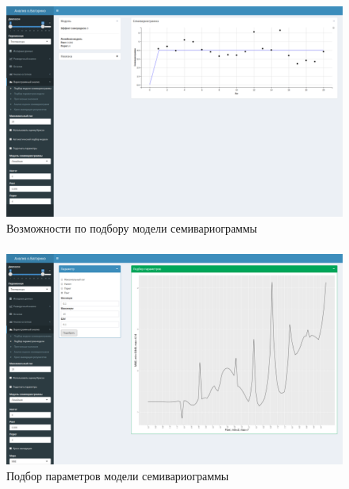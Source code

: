 \documentclass[notheorems]{beamer}
\theoremstyle{definition}
\theoremstyle{example}
\theoremstyle{plain}
\begin{document}
\begin{frame}
  \frametitle{\large\secname}
  \framesubtitle{\subsecname}
    \begin{figure}[h]
    \includegraphics[width=1\textwidth]{../../figures/static/4_variogram.png}
    \caption{Возможности по подбору модели семивариограммы}
  \end{figure}
\end{frame}

\begin{frame}
  \frametitle{\large\secname}
  \framesubtitle{\subsecname}
    \begin{figure}[h]
    \includegraphics[width=1\textwidth]{../../figures/static/5_fit.png}
    \caption{Подбор параметров модели семивариограммы}
  \end{figure}
\end{frame}
\end{document}
